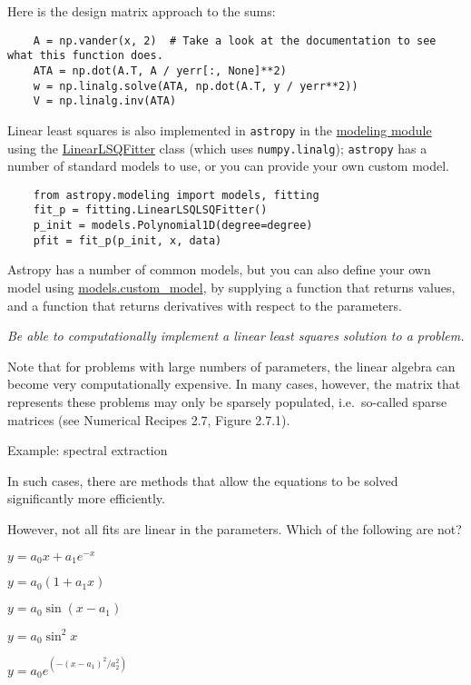 \documentclass[12pt]{article}
\begin{document}
Here is the design matrix approach to the sums:

\begin{verbatim}
    A = np.vander(x, 2)  # Take a look at the documentation to see what this function does.
    ATA = np.dot(A.T, A / yerr[:, None]**2)
    w = np.linalg.solve(ATA, np.dot(A.T, y / yerr**2))
    V = np.linalg.inv(ATA)
\end{verbatim}

Linear least squares is also implemented in \texttt{astropy} in the
\href{http://astropy.readthedocs.org/en/v1.0.6/modeling/index.html}
{modeling module} using the
\href{http://astropy.readthedocs.org/en/v1.0.6/api/astropy.modeling.fitting.LinearLSQFitter.html#astropy.modeling.fitting.LinearLSQFitter}
{LinearLSQFitter} class (which uses \texttt{numpy.linalg});
\texttt{astropy} has a number of standard models to use,
or you can provide your own custom model.

\begin{verbatim}
    from astropy.modeling import models, fitting
    fit_p = fitting.LinearLSQLSQFitter()
    p_init = models.Polynomial1D(degree=degree)
    pfit = fit_p(p_init, x, data)
\end{verbatim}

Astropy has a number of common models, but you can also define your own
model using
\href{http://astronomy.nmsu.edu/holtz/a575/ay575notes/astropy.readthedocs.org/en/v1.0.6/api/astropy.modeling.custom_model.html#astropy.modeling.custom_model}
{models.custom\_model}, by supplying a function that returns
values, and a function that returns derivatives with respect to the
parameters.

\colorbox{hl}{\parbox{0.9\textwidth}
{\emph{Be able to computationally implement a linear least squares solution
to a problem.}}}

Note that for problems with large numbers of parameters, the linear algebra
can become very computationally expensive. In many cases, however, the
matrix that represents these problems may only be sparsely populated,
i.e.\ so-called sparse matrices (see Numerical Recipes 2.7, Figure 2.7.1).

Example: spectral extraction

In such cases, there are methods that allow the equations to be solved
significantly more efficiently.

However, not all fits are linear in the parameters. Which of the
following are not?
\begin{itemize*}
    \item $y = a_{0}x + a_{1}e^{-x}$
    \item $y = a_{0}(1 + a_{1}x)$
    \item $y = a_{0}\sin(x - a_{1})$
    \item $y = a_{0}\sin^{2}x$
    \item $y = a_{0}e^{(-(x-a_{1})^{2}/a_{2}^{2})}$
\end{itemize*}
\end{document}

